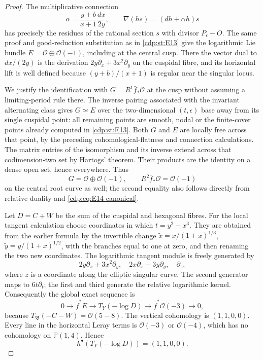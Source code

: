 \begin{proof}
The multiplicative connection
\[
 \alpha=\frac{y+b}{x+1}\frac{dx}{2y},\qquad
 \nabla(hs)=(dh+\alpha h)s
\]
has precisely the residues of the rational section $s$ with divisor
$P_\epsilon-O$. The same proof and good-reduction substitution as
in \ref{cdp:st:E13} give the logarithmic Lie bundle
$E=\mathcal O\oplus\mathcal O(-1)$, including at the central
cusp. There the vector dual to $dx/(2y)$ is the derivation
$2y\partial_x+3x^2\partial_y$ on the cuspidal fibre, and its
horizontal lift is well defined because
$(y+b)/(x+1)$ is regular near the singular locus.

We justify the identification with $G=R^1\bar f_*\mathcal O$
at the cusp without assuming a limiting-period rule there.
The inverse pairing associated with the invariant alternating
class gives $G\simeq E$ over the two-dimensional $(t,\epsilon)$
base away from its single cuspidal point: all remaining points
are smooth, nodal or the finite-cover points already computed in
\ref{cdp:st:E13}. Both $G$ and $E$ are locally free across that point, by the
preceding cohomological-flatness and connection calculations.
The matrix entries of the isomorphism and its inverse extend
across that codimension-two set by Hartogs' theorem. Their products
are the identity on a dense open set, hence everywhere. Thus
\[
 G=\mathcal O\oplus\mathcal O(-1),\qquad
 R^2\bar f_*\mathcal O=\mathcal O(-1)
\]
on the central root curve as well; the second equality also follows
directly from relative duality and \eqref{cdp:eq:E14-canonical}.

Let $D=C+W$ be the sum of the cuspidal and hexagonal fibres.
For the local tangent calculation choose coordinates in which
$t=y^2-x^3$. They are obtained from the earlier formula by the
invertible change $\widetilde x=x/(1+x)^{1/3}$,
$\widetilde y=y/(1+x)^{1/2}$, with the branches equal to one at
zero, and then renaming the two new coordinates. The logarithmic
tangent module is freely generated by
\[
 2y\partial_x+3x^2\partial_y,\quad
 2x\partial_x+3y\partial_y,\quad\partial_z,
\]
where $z$ is a coordinate along the elliptic singular curve. The
second generator maps to $6t\partial_t$;
the first and third generate the relative logarithmic kernel.
Consequently the global exact sequence is
\[
 0\longrightarrow\bar f^*E\longrightarrow T_Y(-\log D)
 \longrightarrow\bar f^*\mathcal O(-3)\longrightarrow0,
\]
because $T_{\mathfrak B}(-C-W)=\mathcal O(5-8)$.
The vertical cohomology is $(1,1,0,0)$. Every line in the
horizontal Leray terms is $\mathcal O(-3)$ or $\mathcal O(-4)$,
which has no cohomology on $\mathbb P(1,4)$. Hence
\begin{equation}\label{cdp:eq:E14-log-coho}
 h^\bullet(T_Y(-\log D))=(1,1,0,0).
\end{equation}


\end{proof}
